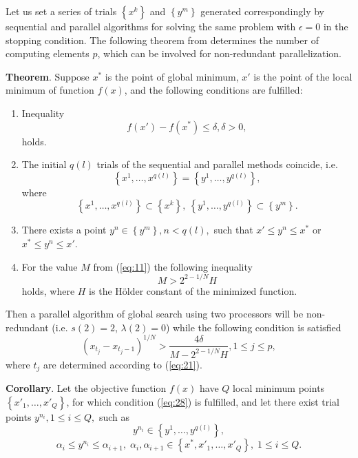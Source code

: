 \documentclass[smallcondensed]{svjour3}     %
\begin{document}
Let us set a series of trials $\left\{x^k\right\}$ and $\left\{y^m\right\}$ generated correspondingly by sequential and parallel algorithms for solving the same problem with $\epsilon = 0$ in the stopping condition. The following theorem from \cite{RefStrongin2000} determines the number of computing elements $p$, which can be involved for non-redundant parallelization.

\textbf{Theorem}. Suppose $x^\ast$ is the point of global minimum, $x'$ is the point of the local minimum of function $f(x)$, and the following conditions are fulfilled:
\begin{enumerate}
	\item
	Inequality 
	\begin{equation}\label{eq:28}
	f(x')-f(x^\ast)\leq \delta, \delta>0,
	\end{equation}
	holds.
	\item
	The initial $q(l)$ trials of the sequential and parallel methods coincide, i.e.
	\[
	\left\{x^1,\dots,x^{q(l)}\right\}=\left\{y^1,\dots,y^{q(l)}\right\},
	\]
	where 
	\[
	\left\{x^1,\dots,x^{q(l)}\right\}\subset\left\{x^k\right\}, \ \left\{y^1,\dots,y^{q(l)}\right\}\subset\left\{y^m\right\}.
	\]
	\item
	There exists a point $y^n\in \left\{y^m\right\}, n<q(l),$ such that $x'\leq y^n \leq x^\ast$ or \mbox{$x^\ast \leq y^n \leq x'$}.
	\item
	For the value $M$ from (\ref{eq:11}) the following inequality
	\[
	M>2^{2-1/N}H
	\]
	holds, where $H$ is the H{\"o}lder constant of the minimized function.
\end{enumerate}

Then a parallel algorithm of global search using two processors will be non-redundant (i.e. $s(2)=2$, $\lambda(2)=0$) while the following condition is satisfied 
\begin{equation}\label{eq:32}
\left(x_{t_j}-x_{t_j-1}\right)^{1/N} > \frac{4\delta}{M-2^{2-1/N}H}, 1\leq j\leq p,	
\end{equation}
where $t_j$ are determined according to (\ref{eq:21}).

\textbf{Corollary}. Let the objective function $f(x)$ have $Q$ local minimum points $\left\{x'_1,\dots,x'_Q\right\}$, for which condition (\ref{eq:28}) is fulfilled, and let there exist trial points $y^{n_i}, 1\leq i \leq Q,$ such as
\[
y^{n_i}\in \left\{y^1,\dots,y^{q(l)}\right\},
\]
\[
\alpha_i \leq y^{n_i} \leq \alpha_{i+1}, \; \alpha_i, \alpha_{i+1} \in \left\{x^\ast, x'_1,\dots,x'_Q\right\}, \; 1\leq i \leq Q.
\]
\end{document}
